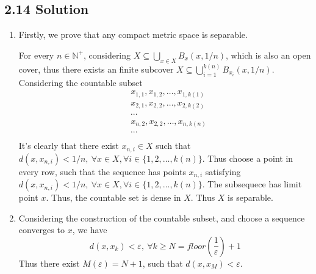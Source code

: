 \documentclass{article}
\begin{document}
\subsection*{2.14 Solution}
\begin{enumerate}
    \item Firstly, we prove that any compact metric space is separable.
    
    For every \(n \in \mathbb N^+\), considering \(X \subseteq \bigcup_{x \in X}B_x(x, 1/n)\), which is also an open cover, thus there exists an finite subcover \(X \subseteq \bigcup_{i = 1}^{k(n)} B_{x_i}(x, 1/n)\). Considering the countable subset 
    \begin{align*}
        &x_{1, 1}, x_{1, 2}, \ldots, x_{1, k(1)}\\
        &x_{2, 1}, x_{2, 2}, \ldots, x_{2, k(2)}\\
        &\cdots\\
        &x_{n, 2}, x_{2, 2}, \ldots, x_{n, k(n)}\\
        &\cdots\\
    \end{align*}
    It's clearly that there exist \(x_{n, i} \in X\) such that \(d(x, x_{n, i}) < 1/n,\ \forall x \in X, \forall i \in \{1, 2, \ldots, k(n)\}\). Thus choose a point in every row, such that the sequence has points \(x_{n, i}\) satisfying \(d(x, x_{n, i}) < 1/n,\ \forall x \in X, \forall i \in \{1, 2, \ldots, k(n)\}\). The subsequece has limit point \(x\). Thus, the countable set is dense in \(X\). Thus \(X\) is separable.

    \item Considering the construction of the countable subset, and choose a sequence converges to \(x\), we have
    \[d(x, x_k) < \varepsilon,\ \forall k \ge N = floor(\frac{1}{\varepsilon}) + 1\]
    Thus there exist \(M(\varepsilon) = N + 1\), such that \(d(x, x_M) < \varepsilon\).
\end{enumerate}
\end{document}
